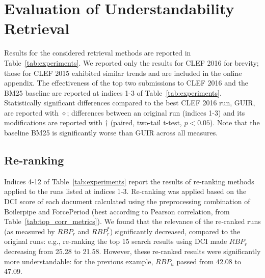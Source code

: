 \section{Evaluation of Understandability Retrieval}
\label{sec:results}




Results for the considered retrieval methods are reported in Table~\ref{tab:experiments}. We reported only the results for CLEF 2016 for brevity; those for CLEF 2015 exhibited similar trends and are included in the online appendix. The effectiveness of the top two submissions to CLEF 2016 and the BM25 baseline are reported at indices 1-3 of Table~\ref{tab:experiments}. Statistically significant differences compared to the best CLEF 2016 run, GUIR, are reported with $\diamond$; differences between an original run (indices 1-3) and its modifications are reported with $\dagger$ (paired, two-tail t-test, $p<0.05$). Note that the baseline BM25 is significantly worse than GUIR across all measures. 



\subsection{Re-ranking}
\label{results:reranking}

Indices 4-12 of Table~\ref{tab:experiments} report the results of re-ranking methods applied to the runs listed at indices 1-3. Re-ranking was applied based on the DCI score of each document calculated using the preprocessing combination of Boilerpipe and ForcePeriod (best according to Pearson correlation, from Table~\ref{tab:top_corr_metrics}).
We found that the relevance of the re-ranked runs (as measured by $RBP_r$ and $RBP_r^*$) significantly decreased, compared to the original runs: e.g.,  re-ranking the top 15 search results using DCI  made $RBP_r$ decreasing from 25.28 to 21.58. However, these re-ranked results were significantly more understandable: for the previous example, $RBP_u$ passed from 42.08 to 47.09.

